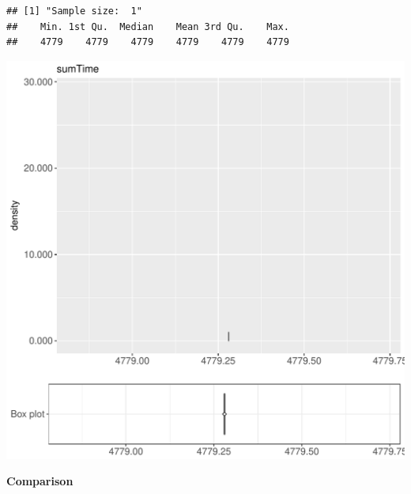 \documentclass{article}\usepackage[]{graphicx}\usepackage[]{color}
\makeatletter
\def\maxwidth{ %
  \ifdim\Gin@nat@width>\linewidth
    \linewidth
  \else
    \Gin@nat@width
  \fi
}
\newenvironment{kframe}{%
 \def\at@end@of@kframe{}%
 \ifinner\ifhmode%
  \def\at@end@of@kframe{\end{minipage}}%
  \begin{minipage}{\columnwidth}%
 \fi\fi%
 \def\FrameCommand##1{\hskip\@totalleftmargin \hskip-\fboxsep
 \colorbox{shadecolor}{##1}\hskip-\fboxsep
     \hskip-\linewidth \hskip-\@totalleftmargin \hskip\columnwidth}%
 \MakeFramed {\advance\hsize-\width
   \@totalleftmargin\z@ \linewidth\hsize
   \@setminipage}}%
 {\par\unskip\endMakeFramed%
 \at@end@of@kframe}
\newenvironment{knitrout}{}{} %
\makeatother
\begin{document}
\begin{knitrout}
\color{fgcolor}\begin{kframe}
\begin{verbatim}
## [1] "Sample size:  1"
##    Min. 1st Qu.  Median    Mean 3rd Qu.    Max. 
##    4779    4779    4779    4779    4779    4779
\end{verbatim}


{\ttfamily\noindent\bfseries{}}\end{kframe}
\includegraphics[width=\maxwidth]{figure/RH2_trivialcaching_password2-1} 

\end{knitrout}
  
 \textbf{Comparison}
  
\end{document}
